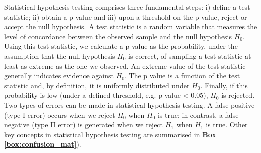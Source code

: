 \vspace{4mm}

Statistical hypothesis testing comprises three fundamental steps: i) define a test statistic; ii) obtain a p value and iii) upon a threshold on the p value, reject or accept the null hypothesis. 
A test statistic is a random variable that measures the level of concordance between the observed sample and the null hypothesis $H_0$. 
Using this test statistic, we calculate a p value as the probability, under the assumption that the null hypothesis $H_0$ is correct, of sampling a test statistic at least as extreme as the one we observed. 
An extreme value of the test statistic generally indicates evidence against $H_0$.
The p value is a function of the test statistic and, by definition, it is uniformly distributed under $H_0$.
Finally, if this probability is low (under a defined threshold, e.g. p value < 0.05), $H_0$ is rejected.\\

Two types of errors can be made in statistical hypothesis testing. 
A false positive (type I error) occurs when we reject $H_0$ when $H_0$ is true; in contrast, a false negative (type II error) is generated when we reject $H_1$ when $H_1$ is true.
Other key concepts in statistical hypothesis testing are summarised in \textbf{Box \ref{box:confusion_mat}}).


\newpage

